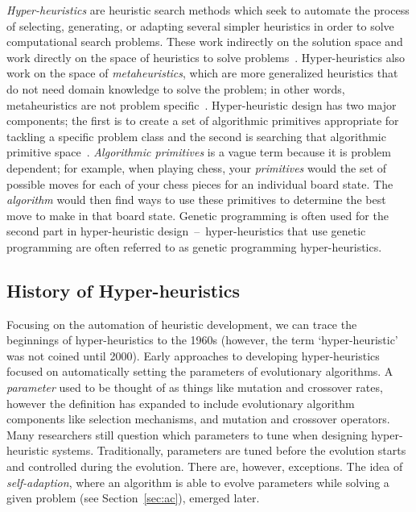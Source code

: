 \documentclass{sig-alternate}
\begin{document}
\textit{Hyper-heuristics} are heuristic search methods which seek to automate the process of selecting, generating, or adapting several simpler heuristics in order to solve computational search problems. These work indirectly on the solution space and work directly on the space of heuristics to solve problems~\cite{tauritz:tutorial}. Hyper-heuristics also work on the space of \textit{metaheuristics}, which are more generalized heuristics that do not need domain knowledge to solve the problem; in other words, metaheuristics are not problem specific~\cite{tauritz:tutorial}. Hyper-heuristic design has two major components; the first is to create a set of algorithmic primitives appropriate for tackling a specific problem class and the second is searching that algorithmic primitive space~\cite{harris:2015}. \textit{Algorithmic primitives} is a vague term because it is problem dependent; for example, when playing chess, your \textit{primitives} would the set of possible moves for each of your chess pieces for an individual board state. The \textit{algorithm} would then find ways to use these primitives to determine the best move to make in that board state. Genetic programming is often used for the second part in hyper-heuristic design~--~hyper-heuristics that use genetic programming are often referred to as genetic programming hyper-heuristics.

\subsection{History of Hyper-heuristics}
\label{sec:history}

Focusing on the automation of heuristic development, we can trace the beginnings of hyper-heuristics to the 1960s (however, the term `hyper-heuristic' was not coined until 2000). Early approaches to developing hyper-heuristics focused on automatically setting the parameters of evolutionary algorithms. A \textit{parameter} used to be thought of as things like mutation and crossover rates, however the definition has expanded to include evolutionary algorithm components like selection mechanisms, and mutation and crossover operators. Many researchers still question which parameters to tune when designing hyper-heuristic systems. Traditionally, parameters are tuned before the evolution starts and controlled during the evolution. There are, however, exceptions. The idea of \textit{self-adaption}, where an algorithm is able to evolve parameters while solving a given problem (see Section~\ref{sec:ac}), emerged later.~\cite{pappa:2014}
\end{document}
